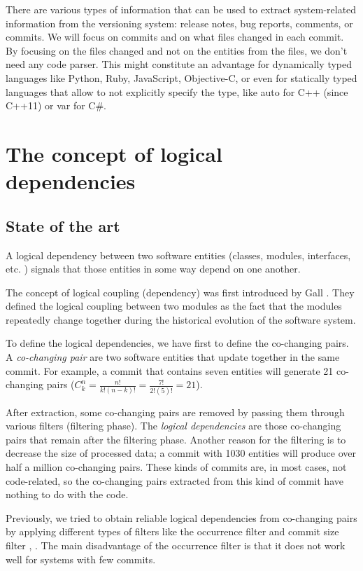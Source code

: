 \documentclass[runningheads]{comsis2}
\newcommand*{\Comb}[2]{{}C^{#1}_{#2}}%
\begin{document}


There are various types of information that can be used to extract system-related information from the versioning system: release notes, bug reports, comments, or commits. We will focus on commits and on what files changed in each commit. By focusing on the files changed and not on the entities from the files, we don't need any code parser. This might constitute an advantage for dynamically typed languages like Python, Ruby, JavaScript, Objective-C, or even for statically typed languages that allow to not explicitly specify the type, like auto for C++ (since C++11) or var for C\#.


\section{The concept of logical dependencies}

\subsection{State of the art}
A logical dependency between two software entities (classes, modules, interfaces, etc. ) signals that those entities in some way depend on one another. 

The concept of logical coupling (dependency) was first introduced by Gall \cite{Gall:1998:DLC:850947.853338}. They defined the logical coupling between two modules as the fact that the modules repeatedly change together during the historical evolution of the software system.

To define the logical dependencies, we have first to define the co-changing pairs. A \textit{co-changing pair} are two software entities that update together in the same commit. For example, a commit that contains seven entities will generate 21 co-changing pairs ($\Comb{n}{k}=\frac{n!}{k!(n-k)!} = \frac{7!}{2!(5)!} = 21$).


After extraction, some co-changing pairs are removed by passing them through various filters (filtering phase). The \textit{logical dependencies} are those co-changing pairs that remain after the filtering phase. Another reason for the filtering is to decrease the size of processed data; a commit with 1030 entities will produce over half a million co-changing pairs. These kinds of commits are, in most cases, not code-related, so the co-changing pairs extracted from this kind of commit have nothing to do with the code.

Previously, we tried to obtain reliable logical dependencies from co-changing pairs by applying different types of filters like the occurrence filter and commit size filter \cite{saci19}, \cite{enase19}. The main disadvantage of the occurrence filter is that it does not work well for systems with few commits.
\end{document}
